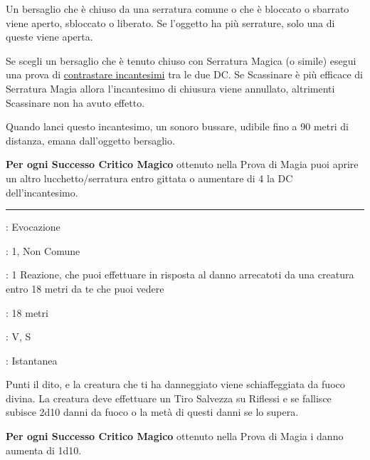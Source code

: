 \begin{multicols}{2}
Un bersaglio che è chiuso da una serratura comune o che è bloccato o sbarrato viene aperto, sbloccato o liberato. Se l'oggetto ha più serrature, solo una di queste viene aperta.

Se scegli un bersaglio che è tenuto chiuso con Serratura Magica (o simile) esegui una prova di \hyperlink{contrastareincantesimi}{contrastare incantesimi} tra le due DC. Se Scassinare è più efficace di Serratura Magia allora l'incantesimo di chiusura viene annullato, altrimenti Scassinare non ha avuto effetto.

Quando lanci questo incantesimo, un sonoro bussare, udibile fino a 90 metri di distanza, emana dall'oggetto bersaglio.

\textbf{Per ogni Successo Critico Magico} ottenuto nella Prova di Magia puoi aprire un altro lucchetto/serratura entro gittata o aumentare di 4 la DC dell'incantesimo.

\smallskip\noindent\rule{\linewidth}{2pt} \hypertarget{Schiaffo di Cattalm}{}\smallskip{}
\noindent
\begin{description}[noitemsep, topsep=0pt, parsep=0pt, partopsep=0pt, leftmargin=0cm, labelwidth=2.8cm]
	\item[\textbf{Lista di Magia}]: Evocazione
	\item[\textbf{Livello}]: 1, Non Comune
	\item[\textbf{T. di Lancio}]: 1 Reazione, che puoi effettuare in risposta al danno arrecatoti da una creatura entro 18 metri da te che puoi vedere
	\item[\textbf{Gittata}]: 18 metri
	\item[\textbf{Componenti}]: V, S
	\item[\textbf{Durata}]: Istantanea
\end{description}

Punti il dito, e la creatura che ti ha danneggiato viene schiaffeggiata da fuoco divina. La creatura deve effettuare un Tiro Salvezza su Riflessi e se fallisce subisce 2d10 danni da fuoco o la metà di questi danni se lo supera.

\textbf{Per ogni Successo Critico Magico} ottenuto nella Prova di Magia i danno aumenta di 1d10.




\end{multicols}

